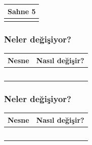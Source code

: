 \documentclass[12pt, a4paper]{article}
\begin{document}
\vspace{5ex}
\noindent
\begin{tabular}{| p{16.5cm}  |  }
\hline			
Sahne 5\\
\hline
 \\[50ex]
\hline  
\end{tabular}

\vspace{5ex}

\subsubsection*{Neler değişiyor?}
\begin{tabular}{| p{4cm} | p{11cm} |  }
\hline			
Nesne&Nasıl değişir?\\
\hline
& \\[6ex]
\hline  
& \\[6ex]
\hline  
& \\[6ex]
\hline  
& \\[6ex]
\hline  
& \\[6ex]
\hline  
\end{tabular}


\subsubsection*{Neler değişiyor?}
\begin{tabular}{| p{4cm} | p{11cm} |  }
\hline			
Nesne&Nasıl değişir?\\
\hline
& \\[6ex]
\hline  
& \\[6ex]
\hline  
& \\[6ex]
\hline  
& \\[6ex]
\hline  
& \\[6ex]
\hline  
\end{tabular}

\end{document}
